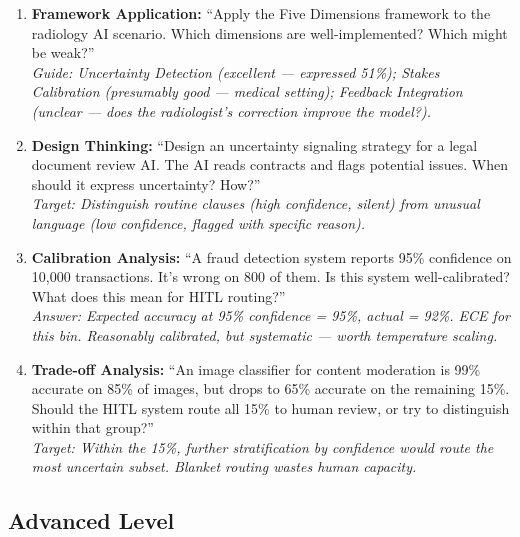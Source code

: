 \begin{enumerate}
    \item \textbf{Framework Application:} ``Apply the Five Dimensions framework to the radiology AI scenario. Which dimensions are well-implemented? Which might be weak?''\\
    \textit{Guide: Uncertainty Detection (excellent --- expressed 51\%); Stakes Calibration (presumably good --- medical setting); Feedback Integration (unclear --- does the radiologist's correction improve the model?).}

    \item \textbf{Design Thinking:} ``Design an uncertainty signaling strategy for a legal document review AI. The AI reads contracts and flags potential issues. When should it express uncertainty? How?''\\
    \textit{Target: Distinguish routine clauses (high confidence, silent) from unusual language (low confidence, flagged with specific reason).}

    \item \textbf{Calibration Analysis:} ``A fraud detection system reports 95\% confidence on 10,000 transactions. It's wrong on 800 of them. Is this system well-calibrated? What does this mean for HITL routing?''\\
    \textit{Answer: Expected accuracy at 95\% confidence = 95\%, actual = 92\%. ECE  for this bin. Reasonably calibrated, but systematic --- worth temperature scaling.}

    \item \textbf{Trade-off Analysis:} ``An image classifier for content moderation is 99\% accurate on 85\% of images, but drops to 65\% accurate on the remaining 15\%. Should the HITL system route all 15\% to human review, or try to distinguish within that group?''\\
    \textit{Target: Within the 15\%, further stratification by confidence would route the most uncertain subset. Blanket routing wastes human capacity.}
\end{enumerate}

\subsection{Advanced Level}

